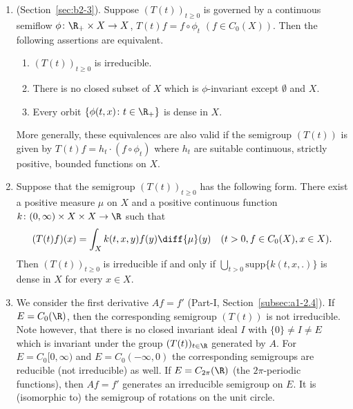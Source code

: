 \begin{examples}\label{ex:b3-3.4}
%
	
\begin{enumerate}[\upshape (i), wide, labelindent=.25em]
	\item 
	(\cf Section~\ref{sec:b2-3}). Suppose $(T(t))_{t\geq 0}$ is governed by a continuous semiflow
     $\phi \colon \R_{+} \times X \to X$, \ie $T(t)f = f\circ\phi_{t}$ $(f\in C_{0}(X))$.
	Then the following assertions are equivalent.
	\begin{enumerate}[\upshape (a)]
		\item 
		$(T(t))_{t\geq 0}$ is irreducible.
	
		\item 
		There is no closed subset of\/ $X$ which is $\phi$-invariant except $\emptyset$ and $X$.
	
		\item 
		Every orbit $\{\phi(t,x) \colon t \in \R_{+}\}$ is dense in $X$.
	\end{enumerate}
	More generally, these equivalences are also valid if the semigroup $(T(t))$ is given by $T(t)f = h_{t}\cdot(f\circ\phi_{t})$ where $h_{t}$ are suitable continuous, strictly positive, bounded functions on $X$.
	
	\item 
	Suppose that the semigroup $(T(t))_{t\geq 0}$ has the following form. 
    There exist a positive measure $\mu$ on $X$ and a positive continuous function $k \colon (0,\infty) \times X \times X \to \R$ such that
	\begin{equation}\label{eq:b3-3.1}
		(T(t)f)(x) = \int_{X} k(t,x,y)f(y) \diff{\mu}(y) \quad (t > 0, f \in C_{0}(X), x \in X).		
	\end{equation}	
	Then $(T(t))_{t\geq 0}$ is irreducible if and only if\/ $\bigcup_{t>0}\text{supp}\{k(t,x,.)\}$ is dense in $X$ for every $x \in X$.
	
	\item 
	We consider the first derivative $Af = f'$ (\cf Part-I, Section~\ref{subsec:a1-2.4}). 
    If\/ $E = C_{0}(\R)$, then the corresponding semigroup $(T(t))$ is not irreducible.
	Note however, that there is no closed invariant ideal $I$ with $\{0\} \neq I \neq E$ which is invariant under the group $(T(t))_{t\in\R}$ generated by $A$.
	For $E = C_{0}[0,\infty)$ and $E = C_{0}(-\infty,0)$ the corresponding semigroups are reducible (\ie not irreducible) as well.
	If\/ $E = C_{2\pi}(\R)$ (\ie the $2\pi$-periodic functions), then $Af = f'$ generates an irreducible semigroup on $E$.
	It is (isomorphic to) the semigroup of rotations on the unit circle.
    

\end{enumerate}
\end{examples}
